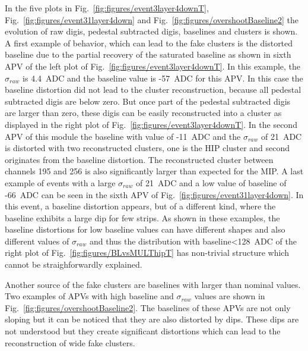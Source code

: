 In the five plots in Fig.~\ref{fig:figures/event3layer4downT},  Fig.~\ref{fig:figures/event31layer4down} and Fig.~\ref{fig:figures/overshootBaseline2} the evolution of raw digis, pedestal subtracted digis, baselines and clusters is shown. A first example of behavior, which can lead to the fake clusters is the distorted baseline due to the partial recovery of the saturated baseline as shown in sixth APV of the left plot of Fig.~\ref{fig:figures/event3layer4downT}. In this example, the $\sigma_{raw}$ is 4.4~ADC and the baseline value is -57~ADC for this APV. In this case the baseline distortion did not lead to the cluster reconstruction, because all pedestal subtracted digis are below zero. But once part of the pedestal subtracted digis are larger than zero, these digis can be easily reconstructed into a cluster as displayed in the right plot of  Fig.~\ref{fig:figures/event3layer4downT}. In the second APV of this module the baseline with value of -11~ADC and the $\sigma_{raw}$ of 21~ADC is distorted with two reconstructed clusters, one is the HIP cluster and second originates from the baseline distortion. The reconstructed cluster between channels 195 and 256 is also significantly larger than expected for the MIP. A last example of events with a large $\sigma_{raw}$ of 21~ADC and a low value of baseline of -66~ADC can be seen in the sixth APV of Fig.~\ref{fig:figures/event31layer4down}. In this event, a baseline distortion appears, but of a different kind, where the baseline exhibits a large dip for few strips. As shown in these examples, the baseline distortions for low baseline values can have different shapes and also different values of $\sigma_{raw}$ and thus the distribution with baseline<128~ADC of the right plot of Fig.~\ref{fig:figures/BLvsMULThipT} has non-trivial structure which cannot be straighforwardly explained. 

Another source of the fake clusters are baselines with larger than nominal values. Two examples of APVs with high baseline and $\sigma_{raw}$ values are shown in Fig.~\ref{fig:figures/overshootBaseline2}. The baselines of these APVs are not only sloping but it can be noticed that they are also distorted by dips. These dips are not understood but they create significant distortions which can lead to the reconstruction of wide fake clusters.


